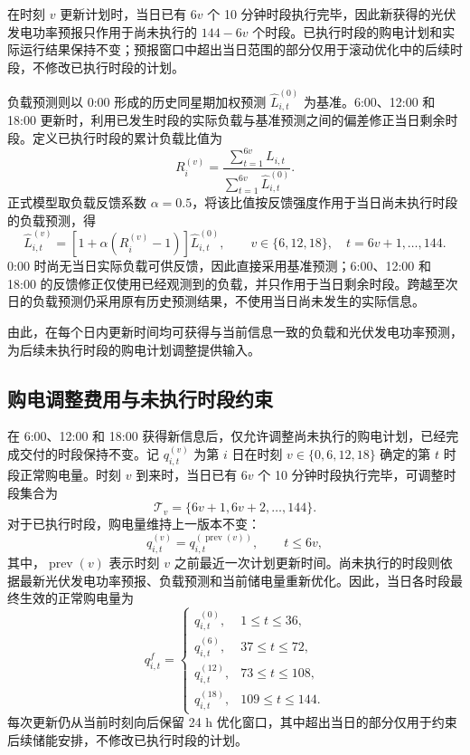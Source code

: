 \documentclass[12pt,a4paper]{ctexart}
\begin{document}
\par\noindent\hspace*{2em}在时刻 $v$ 更新计划时，当日已有 $6v$ 个 10 分钟时段执行完毕，因此新获得的光伏发电功率预报只作用于尚未执行的 $144-6v$ 个时段。已执行时段的购电计划和实际运行结果保持不变；预报窗口中超出当日范围的部分仅用于滚动优化中的后续时段，不修改已执行时段的计划。

\par\noindent\hspace*{2em}负载预测则以 0:00 形成的历史同星期加权预测 $\widehat{L}_{i,t}^{(0)}$ 为基准。6:00、12:00 和 18:00 更新时，利用已发生时段的实际负载与基准预测之间的偏差修正当日剩余时段。定义已执行时段的累计负载比值为
\begin{equation}
R_i^{(v)}=\frac{\displaystyle\sum_{t=1}^{6v}L_{i,t}}{\displaystyle\sum_{t=1}^{6v}\widehat{L}_{i,t}^{(0)}}.
\end{equation}
正式模型取负载反馈系数 $\alpha=0.5$，将该比值按反馈强度作用于当日尚未执行时段的负载预测，得
\begin{equation}
\widehat{L}_{i,t}^{(v)}=\left[1+\alpha\left(R_i^{(v)}-1\right)\right]\widehat{L}_{i,t}^{(0)},\qquad v\in\{6,12,18\},\quad t=6v+1,\ldots,144.
\end{equation}
0:00 时尚无当日实际负载可供反馈，因此直接采用基准预测；6:00、12:00 和 18:00 的反馈修正仅使用已经观测到的负载，并只作用于当日剩余时段。跨越至次日的负载预测仍采用原有历史预测结果，不使用当日尚未发生的实际信息。

\par\noindent\hspace*{2em}由此，在每个日内更新时间均可获得与当前信息一致的负载和光伏发电功率预测，为后续未执行时段的购电计划调整提供输入。
\subsection{购电调整费用与未执行时段约束}
在 6:00、12:00 和 18:00 获得新信息后，仅允许调整尚未执行的购电计划，已经完成交付的时段保持不变。记 $q_{i,t}^{(v)}$ 为第 $i$ 日在时刻 $v\in\{0,6,12,18\}$ 确定的第 $t$ 时段正常购电量。时刻 $v$ 到来时，当日已有 $6v$ 个 10 分钟时段执行完毕，可调整时段集合为
\begin{equation}
\mathcal{T}_v=\{6v+1,6v+2,\ldots,144\}.
\end{equation}
对于已执行时段，购电量维持上一版本不变：
\begin{equation}
q_{i,t}^{(v)}=q_{i,t}^{(\operatorname{prev}(v))},\qquad t\leq 6v,
\end{equation}
其中，$\operatorname{prev}(v)$ 表示时刻 $v$ 之前最近一次计划更新时间。尚未执行的时段则依据最新光伏发电功率预报、负载预测和当前储电量重新优化。因此，当日各时段最终生效的正常购电量为
\begin{equation}
q_{i,t}^{f}=\begin{cases}
q_{i,t}^{(0)}, & 1\leq t\leq36,\\
q_{i,t}^{(6)}, & 37\leq t\leq72,\\
q_{i,t}^{(12)}, & 73\leq t\leq108,\\
q_{i,t}^{(18)}, & 109\leq t\leq144.
\end{cases}
\end{equation}
每次更新仍从当前时刻向后保留 24 h 优化窗口，其中超出当日的部分仅用于约束后续储能安排，不修改已执行时段的计划。
\end{document}

